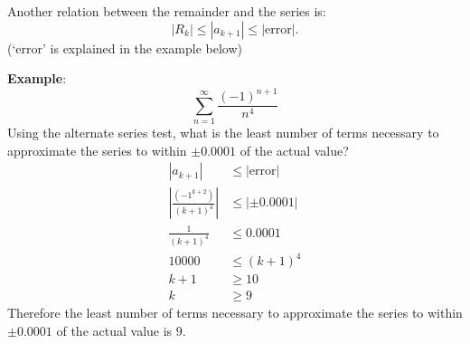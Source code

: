 \documentclass[12pt]{article}
\begin{document}
\noindent Another relation between the remainder and the series is:
\[ |R_k| \le |a_{k+1}| \le |\text{error}|. \]
(`error' is explained in the example below)

\noindent \textbf{Example}:
\[ \sum_{n=1}^\infty \frac{(-1)^{n+1}}{n^4} \]
Using the alternate series test, what is the least number of terms necessary to approximate the series to within $\pm 0.0001$ of the actual value?
\begin{align*}
    |a_{k+1}|                                 & \le |\text{error}| \\[6pt]
    \left| \frac{(-1^{k+2})}{(k+1)^4} \right| & \le |\pm 0.0001|   \\[6pt]
    \frac{1}{(k+1)^4}                         & \le 0.0001         \\[6pt]
    10000                                     & \le (k+1)^4        \\
    k+1                                       & \ge 10             \\
    k                                         & \ge 9
\end{align*}
Therefore the least number of terms necessary to approximate the series to within $\pm 0.0001$ of the actual value is $9$.
\end{document}
